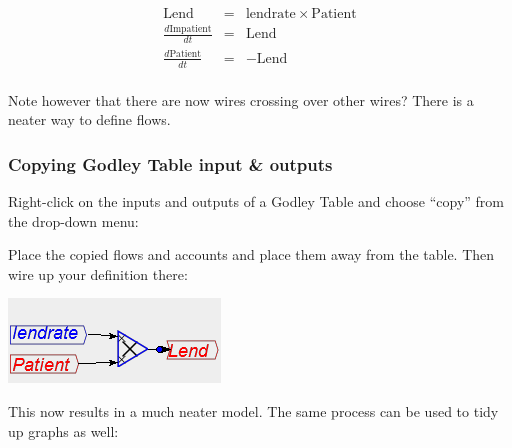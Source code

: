 \begin{eqnarray*}
\mathrm{Lend} & = & \mathrm{lendrate}\times\mathrm{Patient}\\
\frac{d\mathrm{Impatient}}{dt} & = & \mathrm{Lend}\\
\frac{d\mathrm{Patient}}{dt} & = & -\mathrm{Lend}\\
\end{eqnarray*}

Note however that there are now wires crossing over other wires? There
is a neater way to define flows.

\subsubsection{Copying Godley Table input \& outputs}

Right-click on the inputs and outputs of a Godley Table and choose
``copy'' from the drop-down menu:
\begin{center}
\par\end{center}

Place the copied flows and accounts and place them away from the table.
Then wire up your definition there:
\begin{center}
\includegraphics{images/NewItem154} 
\par\end{center}

This now results in a much neater model. The same process can be used
to tidy up graphs as well:
\begin{center}
\par\end{center}

